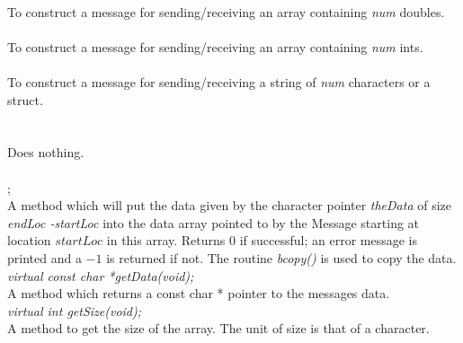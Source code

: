 \\
To construct a message for sending/receiving an array containing {\em
num} doubles. \\

\\
To construct a message for sending/receiving an array containing {\em
num} ints. \\

 \\
To construct a message for sending/receiving a string of {\em num}
characters or a struct. \\ 

 \\
\\ 
Does nothing. \\

  \\
; \\ 
A method which will put the data given by the character pointer {\em
theData} of size {\em endLoc -startLoc} into the data array pointed to
by the Message starting at location $startLoc$ in this array. Returns $0$ if
successful; an error message is printed and a $-1$ is returned if
not. The routine {\em bcopy()} is used to copy the data. \\ 

{\em  virtual const char *getData(void);}\\
A method which returns a const char * pointer to the messages data. \\

{\em  virtual int   getSize(void);} \\
A method to get the size of the array. The unit of size is that of a
character. 

